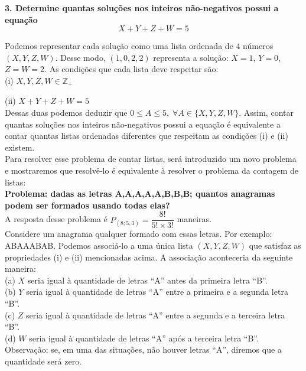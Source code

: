 \documentclass[12pt, a4paper]{article}
\begin{document}
\textbf{3. Determine quantas soluções nos inteiros não-negativos possui a equação \[X+Y+Z+W=5\]} 

Podemos representar cada solução como uma lista ordenada de \(4\) números \((X, Y, Z, W)\). Desse modo, \((1,0,2,2)\) representa a solução: \(X = 1\), \(Y=0\), \(Z = W = 2\). As condições que cada lista deve respeitar são: \\ 

(i) \(X, Y, Z, W \in \mathbb{Z}_+\)

(ii) \(X+Y+Z+W = 5\)\\

Dessas duas podemos deduzir que \(0 \leq A  \leq 5, \; \forall A \in \{X,Y,Z,W\}\). Assim, contar quantas soluções nos inteiros não-negativos possui a equação é equivalente a contar quantas listas ordenadas diferentes que respeitam as condições (i) e (ii) existem.\\

Para resolver esse problema de contar listas, será introduzido um novo problema e mostraremos que resolvê-lo é equivalente à resolver o problema da contagem de listas: \\

\textbf{Problema: dadas as letras A,A,A,A,A,B,B,B; quantos anagramas podem ser formados usando todas elas?} \\

A resposta desse problema é \(P_{(8; 5,3)} = \dfrac{8!}{5!\times 3!}\) maneiras. \\

Considere um anagrama qualquer formado com essas letras. Por exemplo: ABAAABAB. Podemos associá-lo a uma única lista \((X,Y,Z,W)\) que satisfaz as propriedades (i) e (ii) mencionadas acima. A associação aconteceria da seguinte maneira: \\

(a) \(X\) seria igual à quantidade de letras ``A'' antes da primeira letra ``B''. \\
(b) \(Y\) seria igual à quantidade de letras ``A'' entre a primeira e a segunda letra ``B''. \\
(c) \(Z\) seria igual à quantidade de letras ``A'' entre a segunda e a terceira letra ``B''. \\
(d) \(W\) seria igual à quantidade de letras ``A'' após a terceira letra ``B''. \\

Observação: se, em uma das situações, não houver letras ``A'', diremos que a quantidade será zero.\\
\end{document}
